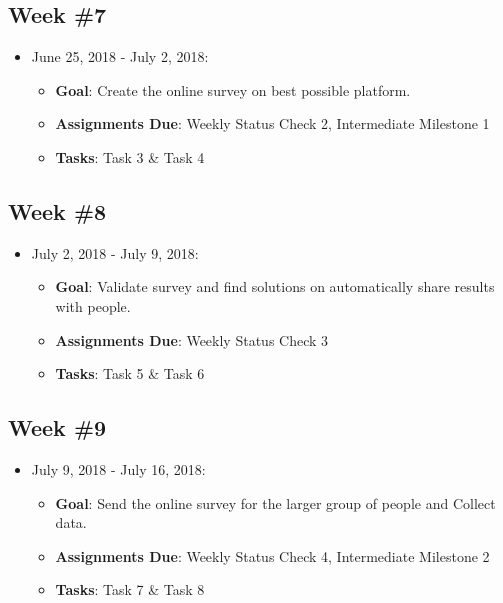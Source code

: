 \documentclass{sigchi}
\begin{document}
 \subsection{Week \#7}
\begin{itemize}
 	\item June 25, 2018 - July 2, 2018:
	\begin{itemize}
 		\item \textbf{Goal}: Create the online survey on best possible platform.
 		\item \textbf{Assignments Due}: Weekly Status Check 2, Intermediate Milestone 1
 		\item \textbf{Tasks}: Task 3 \& Task 4
 	\end{itemize} 
\end{itemize}
 
 \subsection{Week \#8}
\begin{itemize}
 	\item July 2, 2018 - July 9, 2018:
	\begin{itemize}
 		\item \textbf{Goal}: Validate survey and find solutions on automatically share results with people.
 		\item \textbf{Assignments Due}: Weekly Status Check 3
 		\item \textbf{Tasks}: Task 5 \& Task 6
	\end{itemize} 
 \end{itemize} 
 
 \subsection{Week \#9}
\begin{itemize}
 	\item July 9, 2018 - July 16, 2018:
	\begin{itemize}
	 	\item \textbf{Goal}: Send the online survey for the larger group of people and Collect data.
 		\item \textbf{Assignments Due}: Weekly Status Check 4, Intermediate Milestone 2
 		\item \textbf{Tasks}: Task 7 \& Task 8
	\end{itemize} 
 \end{itemize} 
 
\end{document}
